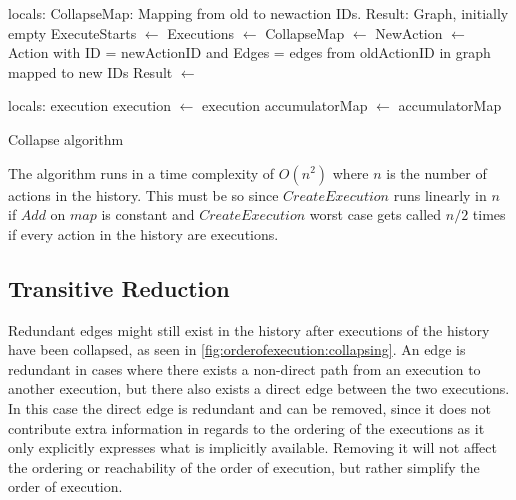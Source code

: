 	\begin{algorithm}[H]
		\begin{algorithmic}
			\State
				locals: CollapseMap: Mapping from old to newaction IDs.
				\State\hspace{28pt} Result: Graph, initially empty
				\State
				\State ExecuteStarts $\leftarrow$  \State
				Executions $\leftarrow$ 
				\State
					CollapseMap $\leftarrow$ 
				\EndFor
					\State
					NewAction $\leftarrow$ Action with \State\hspace{28pt}ID = newActionID and \State\hspace{28pt}Edges = edges from oldActionID in graph mapped to new IDs\State
					Result $\leftarrow$  \State{}
				\EndFor
				
			\EndFunction
			\State
				\State locals: execution
				 \State
					execution $\leftarrow$ 
				\EndWhile\State
				\Return execution
			\EndFunction
			\State
				\State
					accumulatorMap $\leftarrow$ 
				\EndFor \State
				\Return accumulatorMap
			\EndFunction
		\end{algorithmic}
		\caption{Collapse algorithm}
		\label{alg:collapse}
	\end{algorithm}
	
	\newpar The algorithm runs in a time complexity of $O(n^2)$ where $n$ is the number of actions in the history. This must be so since $CreateExecution$ runs linearly in $n$ if $Add$ on $map$ is constant and $CreateExecution$ worst case gets called $n/2$ times if every action in the history are executions. 
	
	\subsection{Transitive Reduction}
	
	\newpar Redundant edges might still exist in the history after executions of the history have been collapsed, as seen in \autoref{fig:orderofexecution:collapsing}. An edge is redundant in cases where there exists a non-direct path from an execution to another execution, but there also exists a direct edge between the two executions. In this case the direct edge is redundant and can be removed, since it does not contribute extra information in regards to the ordering of the executions as it only explicitly expresses what is implicitly available. Removing it will not affect the ordering or reachability of the order of execution, but rather simplify the order of execution.
	
